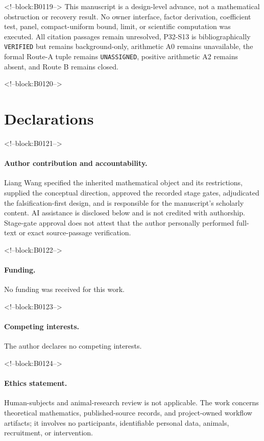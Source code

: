 \documentclass[11pt]{article}
\begin{document}
<!--block:B0119-->
This manuscript is a design-level advance, not a mathematical obstruction
or recovery result. No owner interface, factor derivation, coefficient
test, panel, compact-uniform bound, limit, or scientific computation was
executed. All citation passages remain unresolved, P32-S13 is
bibliographically \texttt{VERIFIED} but remains background-only, arithmetic A0 remains
unavailable, the formal Route-A tuple remains \texttt{UNASSIGNED},
positive arithmetic A2 remains absent, and Route B remains closed.

<!--block:B0120-->
\section*{Declarations}

<!--block:B0121-->
\paragraph{Author contribution and accountability.}
Liang Wang specified the inherited mathematical object and its
restrictions, supplied the conceptual direction, approved the recorded
stage gates, adjudicated the falsification-first design, and is
responsible for the manuscript's scholarly content. AI assistance is
disclosed below and is not credited with authorship. Stage-gate approval
does not attest that the author personally performed full-text or exact
source-passage verification.

<!--block:B0122-->
\paragraph{Funding.} No funding was received for this work.

<!--block:B0123-->
\paragraph{Competing interests.} The author declares no competing
interests.

<!--block:B0124-->
\paragraph{Ethics statement.} Human-subjects and animal-research review
is not applicable. The work concerns theoretical mathematics,
published-source records, and project-owned workflow artifacts; it
involves no participants, identifiable personal data, animals,
recruitment, or intervention.
\end{document}
